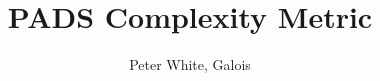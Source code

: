 \documentclass[11pt]{article}
\begin{document}




\title{PADS Complexity Metric}
\author{Peter White, Galois}



\thispagestyle{empty}








\end{document}
